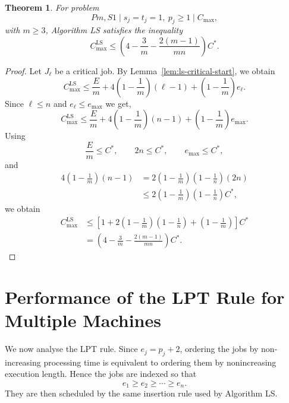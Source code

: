 \documentclass[11pt]{article}
\newtheorem{theorem}{Theorem}[section]
\begin{document}
\begin{theorem}
\label{thm:ls-general-bound}
For problem 
\[
        Pm,S1\mid s_j=t_j=1,\ p_j\ge1\mid C_{\max},
\]
with \(m\ge3\), Algorithm LS satisfies the inequality 
\[
        C_{\max}^{\mathrm{LS}}
        \le
        \left(
        4-\frac3m-\frac{2(m-1)}{mn}
        \right)C^*.
\]
\end{theorem}

\begin{proof}
Let \(J_\ell\) be a critical job. By Lemma~\ref{lem:ls-critical-start}, we obtain 
\[
        C_{\max}^{\mathrm{LS}}
        \le
        \frac{E}{m}
        +
        4\left(1-\frac1m\right)(\ell-1)
        +
        \left(1-\frac1m\right)e_\ell.
\]
Since \(\ell\le n\) and \(e_\ell\le e_{\max}\) we get,
\[
        C_{\max}^{\mathrm{LS}}
        \le
        \frac{E}{m}
        +
        4\left(1-\frac1m\right)(n-1)
        +
        \left(1-\frac1m\right)e_{\max}.
\]
Using
\[
        \frac{E}{m}\le C^*,
        \qquad
        2n\le C^*,
        \qquad
        e_{\max}\le C^*,
\]
and
\[
\begin{aligned}
        4\left(1-\frac1m\right)(n-1)
        &=
        2\left(1-\frac1m\right)
        \left(1-\frac1n\right)(2n) \\
        &\le
        2\left(1-\frac1m\right)
        \left(1-\frac1n\right)C^*,
\end{aligned}
\]
we obtain
\[
\begin{aligned}
        C_{\max}^{\mathrm{LS}}
        &\le
        \left[
        1
        +
        2\left(1-\frac1m\right)
        \left(1-\frac1n\right)
        +
        \left(1-\frac1m\right)
        \right]C^* \\
        &=
        \left(
        4-\frac3m-\frac{2(m-1)}{mn}
        \right)C^*.
\end{aligned}
\]
\end{proof}

\section{Performance of the LPT Rule for Multiple Machines}
\label{sec:lpt-general-m}

We now analyse the LPT rule. Since \(e_j=p_j+2\), ordering the jobs by
non-increasing processing time is equivalent to ordering them by nonincreasing
execution length. Hence the jobs are indexed so that
\[
        e_1\ge e_2\ge\cdots\ge e_n.
\]
They are then scheduled by the same insertion rule used by Algorithm LS.
\end{document}
